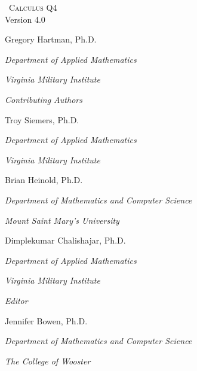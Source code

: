 
\hskip 125pt\begin{minipage}{\textwidth}
\begin{flushright}
\thispagestyle{empty}


\textsc{\large \apex\ {\Huge Calculus Q4}} \\

{\small Version 4.0}\\

\Large
\vspace{1in}

Gregory Hartman, Ph.D.

\emph{\small Department of Applied Mathematics}

\emph{\small Virginia Military Institute}\vskip15pt

\parbox{200pt}{\textit{Contributing Authors}}\hskip 2cm \phantom{.}

%
%

Troy Siemers, Ph.D. 

\emph{\small Department of Applied Mathematics}

\emph{\small Virginia Military Institute}\vskip 15pt

Brian Heinold, Ph.D.

\emph{\small Department of Mathematics and Computer Science}

\emph{\small Mount Saint Mary's University}\vskip 15pt

Dimplekumar Chalishajar, Ph.D.

\emph{\small Department of Applied Mathematics}

\emph{\small Virginia Military Institute}\vskip 25pt

\parbox{200pt}{\textit{Editor}}\hskip 2cm \phantom{.}

Jennifer Bowen, Ph.D.

\emph{\small Department of Mathematics and Computer Science}

\emph{\small The College of Wooster}

\normalsize
\end{flushright}
\end{minipage}

